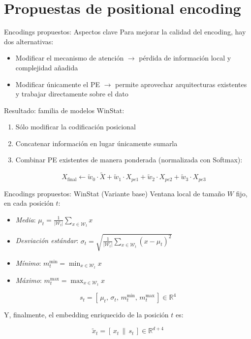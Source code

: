 \documentclass[compress]{beamer}
\begin{document}
	\section{Propuestas de positional encoding}
	\begin{frame}{Encodings propuestos: Aspectos clave}
		Para mejorar la calidad del encoding, hay dos alternativas:
		\begin{itemize}
			\item Modificar el mecanismo de atención $\rightarrow$ pérdida de información local y complejidad añadida
			\item Modificar únicamente el PE $\rightarrow$ permite aprovechar arquitecturas existentes y trabajar directamente sobre el dato
		\end{itemize}
		
		Resultado: familia de modelos WinStat:
		\begin{enumerate}
			\item Sólo modificar la codificación posicional
			\item Concatenar información en lugar únicamente sumarla
			\item Combinar PE existentes de manera ponderada (normalizada con Softmax):
			
			$$X_{\text{final}} \gets \tilde{w}_0 \cdot \tilde{X} + \tilde{w}_1 \cdot X_{pe1} + \tilde{w}_2 \cdot X_{pe2} + \tilde{w}_3 \cdot X_{pe3}$$
			
			 \end{enumerate}
	\end{frame}
	
	\begin{frame}{Encodings propuestos: WinStat (Variante base)}
	Ventana local de tamaño $W$ fijo, en cada posición $t$:
	
	\begin{itemize}
		\item \textit{Media}: $\mu_t = \frac{1}{|\mathcal{W}_t|} \sum_{x \in \mathcal{W}_t} x$
		\item \textit{Desviación estándar}: $\sigma_t = \sqrt{ \frac{1}{|\mathcal{W}_t|} \sum_{x \in \mathcal{W}_t} (x - \mu_t)^2 }$
		\item \textit{Mínimo}: $m^{\min}_t = \min_{x \in \mathcal{W}_t} x$
		\item \textit{Máximo}: $m^{\max}_t = \max_{x \in \mathcal{W}_t} x$
	\end{itemize}
	
	\[
	s_t = [\,\mu_t,\, \sigma_t,\, m^{\min}_t,\, m^{\max}_t\,] \in \mathbb{R}^{4}
	\]
	
	Y, finalmente, el embedding enriquecido de la posición $t$ es:
	
	\[
	\tilde{x}_t = [\,x_t \, \| \, s_t\,] \in \mathbb{R}^{d+4}
	\]
	
	\end{frame}
	
\end{document}
